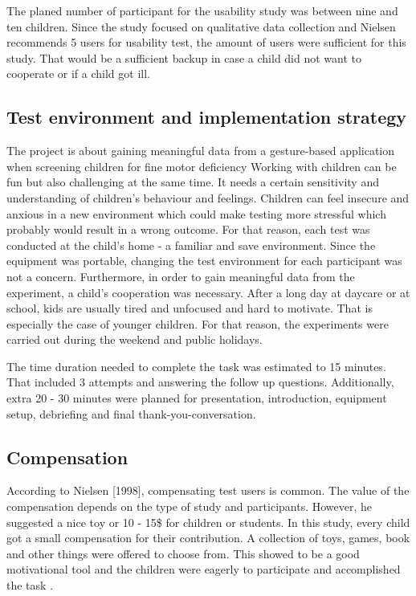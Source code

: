 The planed number of participant for the usability study was between nine and ten children. Since the study focused on qualitative data collection and Nielsen \cite{Nielsen2012} recommends 5 users for usability test, the amount of users were sufficient for this study. That would be a sufficient backup in case a child did not want to cooperate or if a child got ill. 


\subsection{Test environment and implementation strategy}
\label{sec:environmnent}

The project is about gaining meaningful data from a gesture-based application when screening children for fine motor deficiency
Working with children can be fun but also challenging at the same time. It needs a certain sensitivity and understanding of children's behaviour and feelings. Children can feel insecure  and anxious in a new environment which could make testing more stressful which probably would result in a wrong outcome. For that reason, each test was conducted at the child's home - a familiar and save environment. Since the equipment was portable, changing the test environment for each participant was not a concern.
Furthermore, in order to gain meaningful data from the experiment, a child's cooperation was necessary.  After a long day at daycare or at school, kids are usually tired and unfocused and hard to motivate. That is especially the case of younger children. For that reason, the experiments were carried out during the weekend and public holidays.  

The time duration needed to complete the task was estimated to 15 minutes. That included 3 attempts and answering the follow up questions. Additionally, extra 20 - 30 minutes were planned for presentation, introduction, equipment setup, debriefing and final thank-you-conversation.

\subsection{Compensation}

According to Nielsen [1998], compensating test users is common. The value of the compensation depends on the type of study and participants. However, he suggested a nice toy or 10 - 15\$ for children or students.
In this study, every child got a small compensation for their contribution. A collection of toys, games, book and other things were offered to choose from. This showed to be a good motivational tool and the children were eagerly to participate and accomplished the task \cite{Nielsen1998}.

